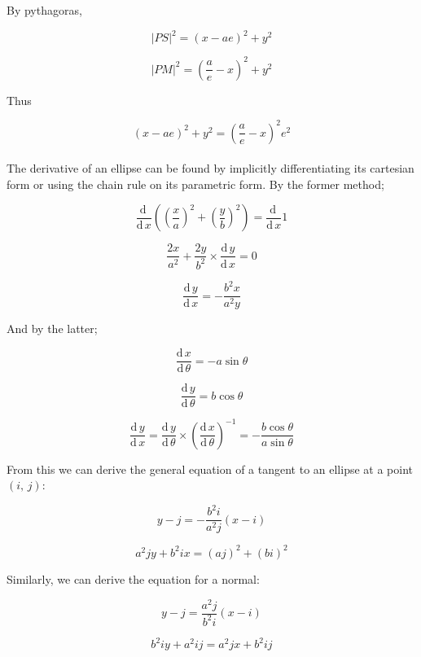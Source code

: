 \documentclass{article}
\newcommand{\de}{\textrm{d}\,}
\begin{document}
\noindent By pythagoras,

\[|PS|^2 = \left(x - ae\right)^2 + y^2\]

\[|PM|^2 = \left(\frac{a}{e} - x\right)^2 + y^2\]

\noindent Thus

\[\left(x - ae\right)^2 + y^2 = \left(\frac{a}{e} - x\right)^2e^2\]\\

\noindent The derivative of an ellipse can be found by implicitly
differentiating its cartesian form or using the chain rule on its parametric
form. By the former method;

\[\frac{\de}{\de x} \left(\left(\frac{x}{a}\right)^2 +
\left(\frac{y}{b}\right)^2\right) = \frac{\de}{\de x}1\]

\[\frac{2x}{a^2} + \frac{2y}{b^2} \times \frac{\de y}{\de x} = 0\]

\[\frac{\de y}{\de x} = -\frac{b^2x}{a^2y}\]

\noindent And by the latter;

\[\frac{\de x}{\de \theta} = -a\sin\theta\]

\[\frac{\de y}{\de \theta} = b\cos\theta\]

\[\frac{\de y}{\de x} = \frac{\de y}{\de \theta} \times \left(\frac{\de x}{\de
\theta}\right)^{-1} = -\frac{b\cos\theta}{a\sin\theta}\]

\noindent From this we can derive the general equation of a tangent to an
ellipse at a point $\left(i,\, j\right)$:

\[y - j = -\frac{b^2i}{a^2j}\left(x - i\right)\]

\[a^2jy + b^2ix = \left(aj\right)^2 + \left(bi\right)^2\]

\noindent Similarly, we can derive the equation for a normal:

\[y - j = \frac{a^2j}{b^2i}\left(x - i\right)\]

\[b^2iy + a^2ij = a^2jx + b^2ij\]
\end{document}
